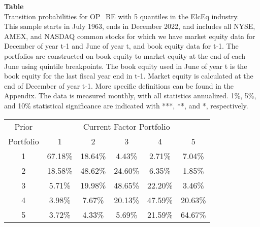 \begin{table*}[ht!]
\raggedright
{}
\label{tab: transition_probs_OP_BE_ElcEq_with_5_quantiles}
\textbf{Table \thetable} \\
Transition probabilities for OP_BE with 5 quantiles in the ElcEq industry. \\
\hspace*{1em}This sample starts in July 1963, ends in December 2022, and includes all NYSE, AMEX, and NASDAQ common stocks for which we have market equity data for December of year t-1 and June of year t, and book equity data for t-1. The portfolios are constructed on book equity to market equity at the end of each June using quintile breakpoints.  The book equity used in June of year t is the book equity for the last fiscal year end in t-1.  Market equity is calculated at the end of December of year t-1.  More specific definitions can be found in the Appendix.  The data is measured monthly, with all statistics annualized.  1\%, 5\%, and 10\% statistical significance are indicated with ***, **, and *, respectively. \\
\vspace{0.5em}
\centering
\begin{adjustbox}{max width=\textwidth}
\begin{tabular}{@{}cccccc@{}}
\toprule
Prior & \multicolumn{5}{c}{Current Factor Portfolio} \\
Portfolio & 1 & 2 & 3 & 4 & 5 \\
\midrule
1 & 67.18\% & 18.64\% & 4.43\% & 2.71\% & 7.04\% \\
2 & 18.58\% & 48.62\% & 24.60\% & 6.35\% & 1.85\% \\
3 & 5.71\% & 19.98\% & 48.65\% & 22.20\% & 3.46\% \\
4 & 3.98\% & 7.67\% & 20.13\% & 47.59\% & 20.63\% \\
5 & 3.72\% & 4.33\% & 5.69\% & 21.59\% & 64.67\% \\
\bottomrule
\end{tabular}
\end{adjustbox}
\end{table*}